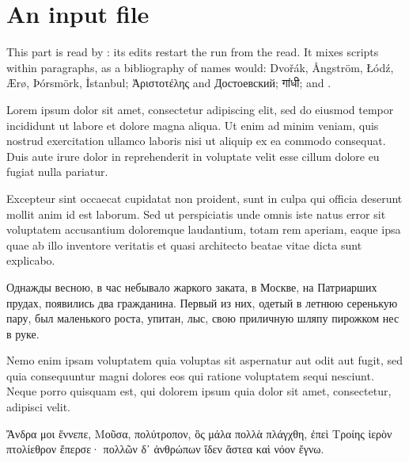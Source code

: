 \section{An input file}\label{sec:part}
This part is read by \verb||: its edits restart the run from the read. It mixes
scripts within paragraphs, as a bibliography of names would: Dvořák, Ångström, Łódź,
Ærø, Þórsmörk, İstanbul; {\greek Ἀριστοτέλης} and {\russian Достоевский}; {\deva गांधी};
 and .

Lorem ipsum dolor sit amet, consectetur adipiscing elit, sed do eiusmod tempor
incididunt ut labore et dolore magna aliqua. Ut enim ad minim veniam, quis nostrud
exercitation ullamco laboris nisi ut aliquip ex ea commodo consequat. Duis aute irure
dolor in reprehenderit in voluptate velit esse cillum dolore eu fugiat nulla pariatur.

Excepteur sint occaecat cupidatat non proident, sunt in culpa qui officia deserunt
mollit anim id est laborum. Sed ut perspiciatis unde omnis iste natus error sit
voluptatem accusantium doloremque laudantium, totam rem aperiam, eaque ipsa quae ab
illo inventore veritatis et quasi architecto beatae vitae dicta sunt explicabo.

{\russian Однажды весною, в час небывало жаркого заката, в Москве, на Патриарших прудах,
появились два гражданина. Первый из них, одетый в летнюю серенькую пару, был маленького
роста, упитан, лыс, свою приличную шляпу пирожком нес в руке.}

Nemo enim ipsam voluptatem quia voluptas sit aspernatur aut odit aut fugit, sed quia
consequuntur magni dolores eos qui ratione voluptatem sequi nesciunt. Neque porro
quisquam est, qui dolorem ipsum quia dolor sit amet, consectetur, adipisci velit.

{\greek Ἄνδρα μοι ἔννεπε, Μοῦσα, πολύτροπον, ὃς μάλα πολλὰ πλάγχθη, ἐπεὶ Τροίης ἱερὸν
πτολίεθρον ἔπερσε· πολλῶν δ᾽ ἀνθρώπων ἴδεν ἄστεα καὶ νόον ἔγνω.}
